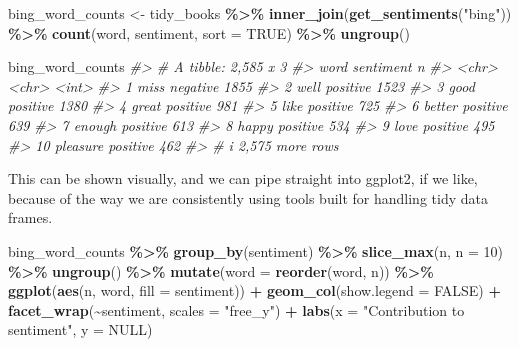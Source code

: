 \documentclass[
]{book}
\newenvironment{Shaded}{\begin{snugshade}}{\end{snugshade}}
\newcommand{\AttributeTok}[1]{\textcolor[rgb]{0.13,0.29,0.53}{#1}}
\newcommand{\CommentTok}[1]{\textcolor[rgb]{0.56,0.35,0.01}{\textit{#1}}}
\newcommand{\ConstantTok}[1]{\textcolor[rgb]{0.56,0.35,0.01}{#1}}
\newcommand{\DecValTok}[1]{\textcolor[rgb]{0.00,0.00,0.81}{#1}}
\newcommand{\FunctionTok}[1]{\textcolor[rgb]{0.13,0.29,0.53}{\textbf{#1}}}
\newcommand{\NormalTok}[1]{#1}
\newcommand{\OtherTok}[1]{\textcolor[rgb]{0.56,0.35,0.01}{#1}}
\newcommand{\SpecialCharTok}[1]{\textcolor[rgb]{0.81,0.36,0.00}{\textbf{#1}}}
\newcommand{\StringTok}[1]{\textcolor[rgb]{0.31,0.60,0.02}{#1}}
\begin{document}
\begin{Shaded}
\begin{Highlighting}[]
\NormalTok{bing\_word\_counts }\OtherTok{\textless{}{-}}\NormalTok{ tidy\_books }\SpecialCharTok{\%\textgreater{}\%}
  \FunctionTok{inner\_join}\NormalTok{(}\FunctionTok{get\_sentiments}\NormalTok{(}\StringTok{"bing"}\NormalTok{)) }\SpecialCharTok{\%\textgreater{}\%}
  \FunctionTok{count}\NormalTok{(word, sentiment, }\AttributeTok{sort =} \ConstantTok{TRUE}\NormalTok{) }\SpecialCharTok{\%\textgreater{}\%}
  \FunctionTok{ungroup}\NormalTok{()}

\NormalTok{bing\_word\_counts}
\CommentTok{\#\textgreater{} \# A tibble: 2,585 x 3}
\CommentTok{\#\textgreater{}    word     sentiment     n}
\CommentTok{\#\textgreater{}    \textless{}chr\textgreater{}    \textless{}chr\textgreater{}     \textless{}int\textgreater{}}
\CommentTok{\#\textgreater{}  1 miss     negative   1855}
\CommentTok{\#\textgreater{}  2 well     positive   1523}
\CommentTok{\#\textgreater{}  3 good     positive   1380}
\CommentTok{\#\textgreater{}  4 great    positive    981}
\CommentTok{\#\textgreater{}  5 like     positive    725}
\CommentTok{\#\textgreater{}  6 better   positive    639}
\CommentTok{\#\textgreater{}  7 enough   positive    613}
\CommentTok{\#\textgreater{}  8 happy    positive    534}
\CommentTok{\#\textgreater{}  9 love     positive    495}
\CommentTok{\#\textgreater{} 10 pleasure positive    462}
\CommentTok{\#\textgreater{} \# i 2,575 more rows}
\end{Highlighting}
\end{Shaded}

This can be shown visually, and we can pipe straight into ggplot2, if we like, because of the way we are consistently using tools built for handling tidy data frames.

\begin{Shaded}
\begin{Highlighting}[]
\NormalTok{bing\_word\_counts }\SpecialCharTok{\%\textgreater{}\%}
  \FunctionTok{group\_by}\NormalTok{(sentiment) }\SpecialCharTok{\%\textgreater{}\%}
  \FunctionTok{slice\_max}\NormalTok{(n, }\AttributeTok{n =} \DecValTok{10}\NormalTok{) }\SpecialCharTok{\%\textgreater{}\%} 
  \FunctionTok{ungroup}\NormalTok{() }\SpecialCharTok{\%\textgreater{}\%}
  \FunctionTok{mutate}\NormalTok{(}\AttributeTok{word =} \FunctionTok{reorder}\NormalTok{(word, n)) }\SpecialCharTok{\%\textgreater{}\%}
  \FunctionTok{ggplot}\NormalTok{(}\FunctionTok{aes}\NormalTok{(n, word, }\AttributeTok{fill =}\NormalTok{ sentiment)) }\SpecialCharTok{+}
  \FunctionTok{geom\_col}\NormalTok{(}\AttributeTok{show.legend =} \ConstantTok{FALSE}\NormalTok{) }\SpecialCharTok{+}
  \FunctionTok{facet\_wrap}\NormalTok{(}\SpecialCharTok{\textasciitilde{}}\NormalTok{sentiment, }\AttributeTok{scales =} \StringTok{"free\_y"}\NormalTok{) }\SpecialCharTok{+}
  \FunctionTok{labs}\NormalTok{(}\AttributeTok{x =} \StringTok{"Contribution to sentiment"}\NormalTok{,}
       \AttributeTok{y =} \ConstantTok{NULL}\NormalTok{)}
\end{Highlighting}
\end{Shaded}
\end{document}
